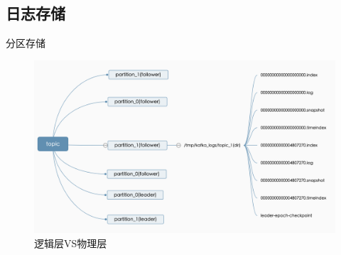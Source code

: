 \subsection{日志存储}
\begin{frame}[plain,t]{分区存储} %
     \\  \vspace{2ex}
    \begin{figure}
        \centering
        \includegraphics[width=0.9\linewidth]{image/0401.png}
        \caption{逻辑层VS物理层}
        \label{fig:0401}
    \end{figure}
    
\end{frame}






